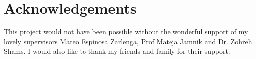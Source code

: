 \documentclass[12pt,a4paper,twoside]{report}
\newif\ifsubmission %
\begin{document}


\ifsubmission\else

\chapter*{Acknowledgements}

This project would not have been possible without the wonderful
support of my lovely supervisors Mateo Espinosa Zarlenga, Prof Mateja Jamnik and Dr. Zohreh Shams. I would also like to 
thank my friends and family for their support.

\fi
\cleardoublepage %

\tableofcontents
\listoffigures
\listoftables



\pagestyle{headings}
\label{lastcontentpage}







\label{lastpage}

\end{document}
